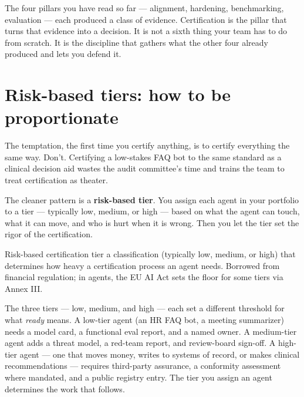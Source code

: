 The four pillars you have read so far --- alignment, hardening, benchmarking, evaluation --- each produced a class of evidence. Certification is the pillar that turns that evidence into a decision. It is not a sixth thing your team has to do from scratch. It is the discipline that gathers what the other four already produced and lets you defend it.

\section{Risk-based tiers: how to be proportionate}

The temptation, the first time you certify anything, is to certify everything the same way. Don't. Certifying a low-stakes FAQ bot to the same standard as a clinical decision aid wastes the audit committee's time and trains the team to treat certification as theater.

The cleaner pattern is a \textbf{risk-based tier}. You assign each agent in your portfolio to a tier --- typically low, medium, or high --- based on what the agent can touch, what it can move, and who is hurt when it is wrong. Then you let the tier set the rigor of the certification.

\begin{TNdefinition}{Risk-based certification tier} a classification (typically low, medium, or high) that determines how heavy a certification process an agent needs. Borrowed from financial regulation; in agents, the EU AI Act sets the floor for some tiers via Annex III. \end{TNdefinition}

The three tiers --- low, medium, and high --- each set a different threshold for what \textit{ready} means. A low-tier agent (an HR FAQ bot, a meeting summarizer) needs a model card, a functional eval report, and a named owner. A medium-tier agent adds a threat model, a red-team report, and review-board sign-off. A high-tier agent --- one that moves money, writes to systems of record, or makes clinical recommendations --- requires third-party assurance, a conformity assessment where mandated, and a public registry entry. The tier you assign an agent determines the work that follows.

